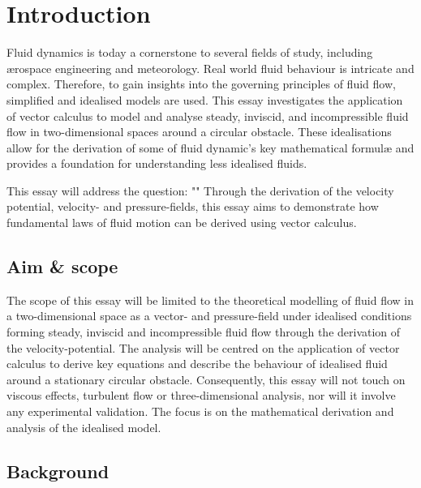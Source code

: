 \section{Introduction}
Fluid dynamics is today a cornerstone to several fields of study, including ærospace engineering and meteorology.
Real world fluid behaviour is intricate and complex. Therefore, to gain insights into the governing principles of
fluid flow, simplified and idealised models are used. This essay investigates the application of vector calculus
to model and analyse steady, inviscid, and incompressible fluid flow in two-dimensional spaces around a circular
obstacle. These idealisations allow for the derivation of some of fluid dynamic's key mathematical formulæ and
provides a foundation for understanding less idealised fluids.

This essay will address the question: "\researchquestion" Through the derivation of the velocity potential,
velocity- and pressure-fields, this essay aims to demonstrate how fundamental laws of fluid motion can be derived
using vector calculus.

\subsection{Aim \& scope}
The scope of this essay will be limited to the theoretical modelling of fluid flow in a two-dimensional space
as a vector- and pressure-field under idealised conditions forming steady, inviscid and incompressible fluid flow
through the derivation of the velocity-potential. The analysis will be centred on the application of vector calculus to
derive key equations and describe the behaviour of idealised fluid around a stationary circular obstacle. Consequently,
this essay will not touch on viscous effects, turbulent flow or three-dimensional analysis, nor will it involve any
experimental validation. The focus is on the mathematical derivation and analysis of the idealised model.

\subsection{Background}
